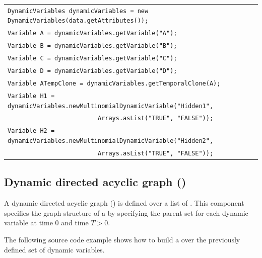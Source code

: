 \vspace{-0.1in}
\begin{table}[H]
\begin{tabular}{l} \\ \hline

        \texttt{DynamicVariables dynamicVariables = new DynamicVariables(data.getAttributes());}\\

        \texttt{Variable A = dynamicVariables.getVariable("A");}\\
        \texttt{Variable B = dynamicVariables.getVariable("B");}\\
        \texttt{Variable C = dynamicVariables.getVariable("C");}\\
        \texttt{Variable D = dynamicVariables.getVariable("D");}\\
        
        \texttt{Variable ATempClone = dynamicVariables.getTemporalClone(A);}\\

        \texttt{Variable H1 = dynamicVariables.newMultinomialDynamicVariable("Hidden1",}\\ \texttt{~~~~~~~~~~~~~~~~~~~~~~~~~Arrays.asList("TRUE", "FALSE"));}\\ 
         \texttt{Variable H2 = dynamicVariables.newMultinomialDynamicVariable("Hidden2",}\\ \texttt{~~~~~~~~~~~~~~~~~~~~~~~~~Arrays.asList("TRUE", "FALSE"));}\\ \hline
\end{tabular}
\end{table}

\subsection{Dynamic directed acyclic graph ()}

A dynamic directed acyclic graph () is defined over a list of . This component specifies the graph structure of a  by specifying the parent set for each dynamic variable at time $0$ and time $T > 0$.

The following source code example shows how to build a  over the previously defined set of dynamic variables. 


